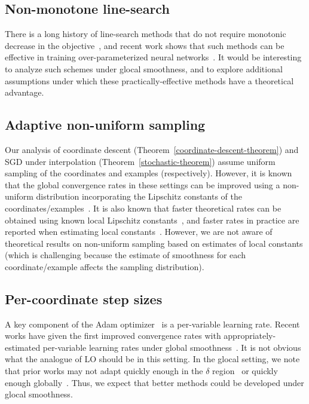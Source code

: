 \documentclass[10pt]{article} %
\begin{document}
\subsection{Non-monotone line-search} There is a long history of line-search methods that do not require monotonic decrease in the objective~\cite{grippo1986nonmonotone,raydan1997barzilai}, and recent work shows that such methods can be effective in training over-parameterized neural networks~\cite{galli2024don}. It would be interesting to analyze such schemes under glocal smoothness, and to explore additional assumptions under which these practically-effective methods have a theoretical advantage.

\subsection{Adaptive non-uniform sampling}
Our analysis of coordinate descent (Theorem~\ref{coordinate-descent-theorem}) and SGD under interpolation (Theorem~\ref{stochastic-theorem}) assume uniform sampling of the coordinates and examples (respectively). However, it is known that the global convergence rates in these settings can be improved using a non-uniform distribution incorporating the Lipschitz constants of the coordinates/examples~\cite{nesterov2012cd,needell2014stochastic}. It is also known that faster theoretical rates can be obtained using known local Lipschitz constants~\cite{VainsencherLZ15}, and faster rates in practice are reported when estimating local constants~\cite{SchmidtRB17}. However, we are not aware of theoretical results on non-uniform sampling based on estimates of local constants (which is challenging because the estimate of smoothness for each coordinate/example affects the sampling distribution).

\subsection{Per-coordinate step sizes} A key component of the Adam optimizer~\cite{kingma2014adam} is a per-variable learning rate. Recent works have given the first improved convergence rates with appropriately-estimated per-variable learning rates under global smoothness~\cite{kunstner2023searching,gao2024gradient}. It is not obvious what the analogue of LO should be in this setting. 
In the glocal setting, we note that prior works may not adapt quickly enough in the $\delta$ region~\cite{kunstner2023searching} or quickly enough globally~\cite{gao2024gradient}.
Thus, we expect that better methods could be developed under glocal smoothness.
\end{document}
